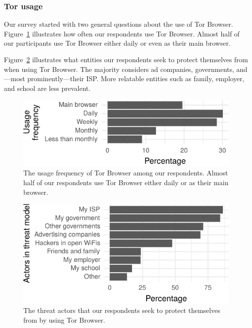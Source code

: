 \subsubsection{Tor usage}

Our survey started with two general questions about the use of Tor Browser.
Figure~\ref{fig:tor-usage} illustrates how often our respondents use Tor
Browser.  Almost half of our participants use Tor Browser either daily or even
as their main browser.

Figure~\ref{fig:tor-threats} illustrates what entities our respondents seek to
protect themselves from when using Tor Browser.  The majority considers ad
companies, governments, and---most prominently---their ISP.  More relatable
entities such as family, employer, and school are less prevalent.

\begin{figure}[t]
    \centering
    \includegraphics[width=\linewidth]{figures/tor-usage.pdf}
    \caption{The usage frequency of Tor Browser among our respondents.  Almost
    half of our respondents use Tor Browser either daily or as their main
    browser.}
    \label{fig:tor-usage}
\end{figure}

\begin{figure}[t]
    \centering
    \includegraphics[width=\linewidth]{figures/tor-threats.pdf}
    \caption{The threat actors that our respondents seek to protect themselves
        from by using Tor Browser.}
    \label{fig:tor-threats}
\end{figure}

